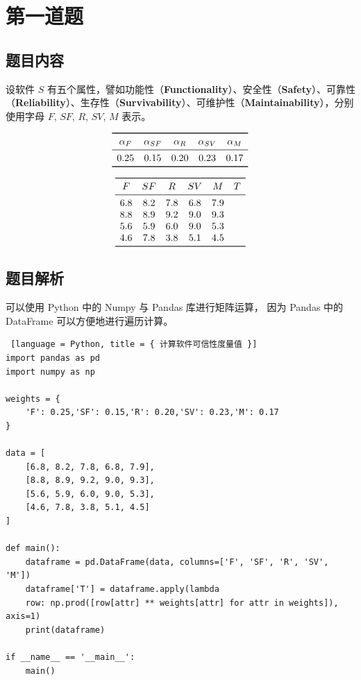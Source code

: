 \section{第一道题}

\subsection{题目内容}

设软件 $S$ 有五个属性，譬如功能性（\textbf{Functionality}）、安全性（\textbf{Safety}）、可靠性（\textbf{Reliability}）、生存性（\textbf{Survivability}）、可维护性（\textbf{Maintainability}），分别使用字母 $F$, $SF$, $R$, $SV$, $M$ 表示。

\[
\begin{array}{cccccc}
\toprule
\alpha_F & \alpha_{SF} & \alpha_R & \alpha_{SV} & \alpha_M \\
\midrule
0.25 & 0.15 & 0.20 & 0.23 & 0.17 \\
\bottomrule
\end{array}
\]

\[
\begin{array}{cccccc}
\toprule
F & SF & R & SV & M & T \\
\midrule
6.8 & 8.2 & 7.8 & 6.8 & 7.9 & \\
8.8 & 8.9 & 9.2 & 9.0 & 9.3 & \\
5.6 & 5.9 & 6.0 & 9.0 & 5.3 & \\
4.6 & 7.8 & 3.8 & 5.1 & 4.5 & \\
\bottomrule
\end{array}
\]

\subsection{题目解析}

可以使用 Python 中的 Numpy 与 Pandas 库进行矩阵运算，
因为 Pandas 中的 DataFrame 可以方便地进行遍历计算。

\begin{lstlisting} [language = Python, title = { 计算软件可信性度量值 }]
import pandas as pd
import numpy as np

weights = {
    'F': 0.25,'SF': 0.15,'R': 0.20,'SV': 0.23,'M': 0.17
}

data = [
    [6.8, 8.2, 7.8, 6.8, 7.9],
    [8.8, 8.9, 9.2, 9.0, 9.3],
    [5.6, 5.9, 6.0, 9.0, 5.3],
    [4.6, 7.8, 3.8, 5.1, 4.5]
]

def main():
    dataframe = pd.DataFrame(data, columns=['F', 'SF', 'R', 'SV', 'M'])
    dataframe['T'] = dataframe.apply(lambda
    row: np.prod([row[attr] ** weights[attr] for attr in weights]), axis=1)
    print(dataframe)

if __name__ == '__main__':
    main()
\end{lstlisting}

